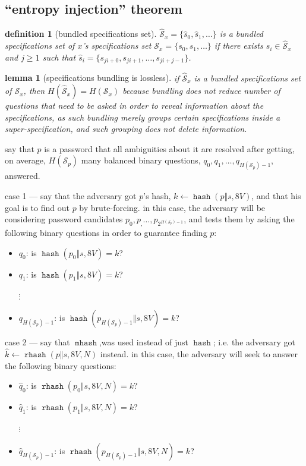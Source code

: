 \documentclass[twocolumn]{article}
\newtheorem{definition}{definition}
\newtheorem{lemma}{lemma}
\DeclareMathOperator{\hash}{\mathtt{hash}}
\DeclareMathOperator{\rhash}{\mathtt{rhash}}
\DeclareMathOperator{\mhash}{\mathtt{mhash}}
\begin{document}
\subsection{``entropy injection'' theorem}
\begin{definition}[bundled specifications set]
    $\mathcal{\hat S}_x = \{\hat s_0, \hat s_1, \ldots\}$ is a bundled
    specifications set of $x$'s specifications set $\mathcal{S}_x = \{s_0,
    s_1, \ldots\}$ if there exists $\hat s_i \in \mathcal{\hat S}_x$ and $j
    \ge 1$ such that $\hat s_i = \{s_{ji+0}, s_{ji+1}, \ldots,
    s_{ji+j-1}\}$.
\end{definition}

\begin{lemma}[specifications bundling is lossless]
    if $\mathcal{\hat S}_x$ is a bundled specifications set of
    $\mathcal{S}_x$, then $H(\mathcal{\hat S}_x) = H(\mathcal{S}_x)$
    because bundling does not reduce number of questions that need to be
    asked in order to reveal information about the specifications, as such
    bundling merely groups certain specifications inside a
    super-specification, and such grouping does not delete information.
\end{lemma}

say that $p$ is a password that all ambiguities about it are resolved after
getting, on average, $H(\mathcal{S}_p)$ many balanced binary questions,
$q_0, q_1, \ldots, q_{H(\mathcal{S}_p)-1}$, answered.

case 1 --- say that the adversary got $p$'s hash, $k \gets \hash(p \Vert s,
8V)$, and that his goal is to find out $p$ by brute-forcing.  in this case,
the adversary will be considering password candidates $p_0, p_, \ldots,
p_{2^{H(\mathcal{S}_p)-1}}$, and tests them by asking the following binary
questions in order to guarantee finding $p$:
\begin{itemize}
    \item $q_0$: is $\hash(p_0 \Vert s, 8V) = k$?
    \item $q_1$: is $\hash(p_1 \Vert s, 8V) = k$?

    $\vdots$

    \item $q_{H(\mathcal{S}_p)-1}$: is $\hash(p_{H(\mathcal{S}_p)-1} \Vert
    s, 8V) = k$?
\end{itemize}

case 2 --- say that $\mhash$,was used instead of just $\hash$;  i.e. the
adversary got $\hat k \gets \rhash(p \Vert s, 8V, N)$ instead.  in this
case, the adversary will seek to answer the following binary questions:
\begin{itemize}
    \item $\hat q_0$: is $\rhash(p_0 \Vert s, 8V, N) = k$?
    \item $\hat q_1$: is $\rhash(p_1 \Vert s, 8V, N) = k$?

    $\vdots$

    \item $\hat q_{H(\mathcal{S}_p)-1}$: is $\rhash(p_{H(\mathcal{S}_p)-1}
    \Vert s, 8V, N) = k$?
\end{itemize}
\end{document}
